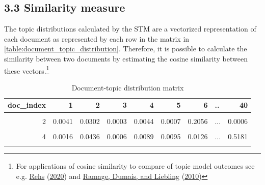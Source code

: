 \documentclass[
  12pt,
]{article}
\begin{document}
\hypertarget{similarity-measure}{%
\subsection{3.3 Similarity measure}\label{similarity-measure}}

The topic distributions calculated by the STM are a vectorized
representation of each document as represented by each row in the matrix
in \autoref{table:document_topic_distribution}. Therefore, it is
possible to calculate the similarity between two documents by estimating
the cosine similarity between these vectors.\footnote{For applications
  of cosine similarity to compare of topic model outcomes see e.g.
  \protect\hyperlink{ref-rehs_structural_2020}{Rehs}
  (\protect\hyperlink{ref-rehs_structural_2020}{2020}) and
  \protect\hyperlink{ref-ramage_characterizing_2010}{Ramage, Dumais, and
  Liebling} (\protect\hyperlink{ref-ramage_characterizing_2010}{2010})}

\begin{table}[H]

\caption{\label{tab:Document-topic distribution matrix - sample values}Document-topic distribution matrix \label{table:document_topic_distribution}}
\centering
\fontsize{7}{9}\selectfont
\begin{tabular}[t]{rrrrrrrlr}
\toprule
doc\_index & 1 & 2 & 3 & 4 & 5 & 6 & .. & 40\\
\midrule
\cellcolor{gray!6}{1} & \cellcolor{gray!6}{0.0016} & \cellcolor{gray!6}{0.0453} & \cellcolor{gray!6}{0.0005} & \cellcolor{gray!6}{0.0078} & \cellcolor{gray!6}{0.0151} & \cellcolor{gray!6}{0.0118} & \cellcolor{gray!6}{...} & \cellcolor{gray!6}{0.4376}\\
2 & 0.0041 & 0.0302 & 0.0003 & 0.0044 & 0.0007 & 0.2056 & ... & 0.0006\\
\cellcolor{gray!6}{3} & \cellcolor{gray!6}{0.0043} & \cellcolor{gray!6}{0.0039} & \cellcolor{gray!6}{0.0012} & \cellcolor{gray!6}{0.0003} & \cellcolor{gray!6}{0.0017} & \cellcolor{gray!6}{0.0266} & \cellcolor{gray!6}{...} & \cellcolor{gray!6}{0.0050}\\
4 & 0.0016 & 0.0436 & 0.0006 & 0.0089 & 0.0095 & 0.0126 & ... & 0.5181\\
\cellcolor{gray!6}{5} & \cellcolor{gray!6}{0.0016} & \cellcolor{gray!6}{0.0515} & \cellcolor{gray!6}{0.0002} & \cellcolor{gray!6}{0.0122} & \cellcolor{gray!6}{0.0050} & \cellcolor{gray!6}{0.0121} & \cellcolor{gray!6}{...} & \cellcolor{gray!6}{0.5750}\\
\bottomrule
\end{tabular}
\end{table}
\end{document}
